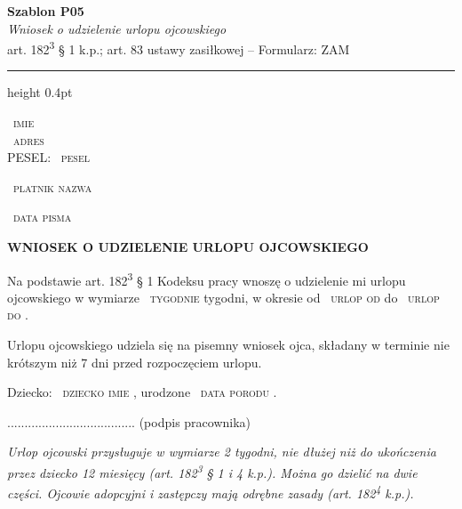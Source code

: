 \documentclass[11pt,a4paper]{article}
\newcommand{\Pole}[1]{%
  \textcolor{szary}{\dotfill}\,%
  {\scriptsize\textcolor{szary}{\textsc{#1}}}%
}
\newcommand{\NaglowekPisma}[1]{%
  \par\vspace{0.8em}%
  \begin{center}%
    {\large\bfseries\MakeUppercase{#1}}%
  \end{center}%
  \vspace{0.4em}%
}
\begin{document}
\begin{flushright}
{\footnotesize\color{szary}
\textbf{Szablon P05}\\
{\itshape Wniosek o udzielenie urlopu ojcowskiego}\\
art. 182\textsuperscript{3} \S{} 1 k.p.; art. 83 ustawy zasiłkowej -- Formularz: ZAM}\
\end{flushright}

\vspace{0.5em}
{\color{ramka}\hrule height 0.4pt}
\vspace{0.8em}

\Pole{imie}\\[-2pt]
\Pole{adres}\\[-2pt]
PESEL: \Pole{pesel}

\Pole{platnik nazwa}

\Pole{data pisma}

\NaglowekPisma{WNIOSEK O UDZIELENIE URLOPU OJCOWSKIEGO}

Na podstawie art. 182\textsuperscript{3} \S{} 1 Kodeksu pracy wnoszę o udzielenie mi urlopu
ojcowskiego w wymiarze \Pole{tygodnie} tygodni, w okresie od \Pole{urlop od} do \Pole{urlop do}.

Urlopu ojcowskiego udziela się na pisemny wniosek ojca, składany w terminie
nie krótszym niż 7 dni przed rozpoczęciem urlopu.

Dziecko: \Pole{dziecko imie}, urodzone \Pole{data porodu}.

.....................................
(podpis pracownika)

\vfill
{\footnotesize\textcolor{szary}\itshape Urlop ojcowski przysługuje w wymiarze 2 tygodni, nie dłużej niż do ukończenia przez dziecko 12 miesięcy (art. 182\textsuperscript{3} \S{} 1 i 4 k.p.). Można go dzielić na dwie części. Ojcowie adopcyjni i zastępczy mają odrębne zasady (art. 182\textsuperscript{4} k.p.). }
\end{document}
